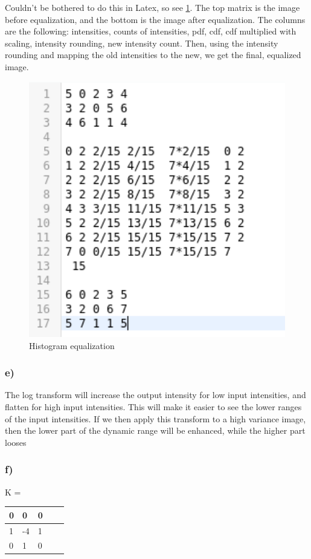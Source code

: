 Couldn't be bothered to do this in Latex, so see \cref{fig:equalizer}. The top matrix is the image before equalization, and the bottom is the image after equalization. The columns are the following: intensities, counts of intensities, pdf, cdf, cdf multiplied with scaling, intensity rounding, new intensity count. Then, using the intensity rounding and mapping the old intensities to the new, we get the final, equalized image. 
\begin{figure}[]
    \centering
    \includegraphics[width=1.00\textwidth]{figures/histogram_equalizer.png}
    \caption{Histogram equalization}
    \label{fig:equalizer}
\end{figure}

\subsubsection*{e)}
The log transform will increase the output intensity for low input intensities, and flatten for high input intensities. This will make it easier to see the lower ranges of the input intensities. If we then apply this transform to a high variance image, then the lower part of the dynamic range will be enhanced, while the higher part looses
%
%
%

\subsubsection*{f)}
\begin{table}[]
    \label{tab:kernel}
    K = \begin{tabular}{|l|l|l|l|l|}
        \hline
        0 & 0 & 0 \\ \hline
        1 &-4 & 1 \\ \hline
        0 & 1 & 0 \\ \hline
    \end{tabular}
\end{table}

